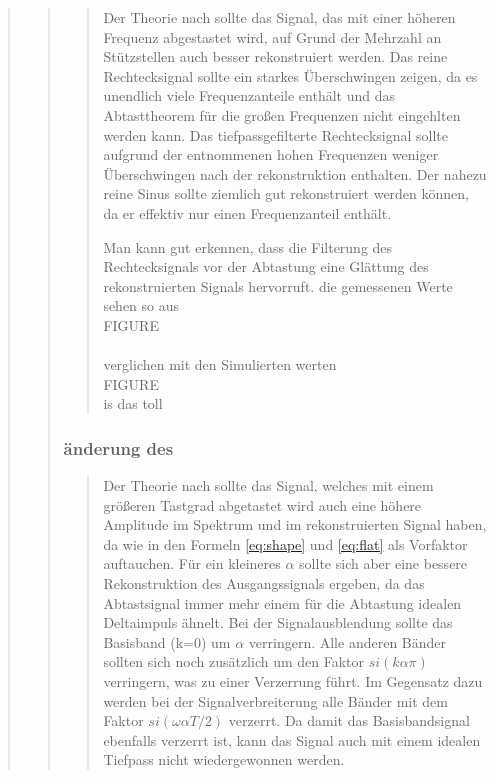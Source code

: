 \begin{quote}
\begin{quote}
\begin{quote}
            Der Theorie nach sollte das Signal, das mit einer höheren
            Frequenz abgestastet wird, auf Grund der Mehrzahl an Stützstellen
            auch besser rekonstruiert werden.
            Das reine Rechtecksignal sollte ein starkes Überschwingen zeigen, da
            es unendlich viele Frequenzanteile enthält und das Abtasttheorem für
            die großen Frequenzen nicht eingehlten werden kann.
            Das tiefpassgefilterte Rechtecksignal sollte aufgrund der
            entnommenen hohen Frequenzen weniger Überschwingen nach der rekonstruktion enthalten.
            Der nahezu reine Sinus sollte ziemlich gut rekonstruiert werden
            können, da er effektiv nur einen Frequenzanteil enthält.
            
            
            Man kann gut erkennen, dass die Filterung des Rechtecksignals vor
            der Abtastung eine Glättung des rekonstruierten Signals hervorruft.  
            die gemessenen Werte sehen so aus\\
            
            FIGURE\\
            \\
            
            
            verglichen mit den Simulierten werten\\
            
            FIGURE\\
            
            is das toll\\
        \end{quote}


        \subsubsection{änderung des \alpha }
        \begin{quote}
             
             Der Theorie nach sollte das Signal, welches mit einem größeren
             Tastgrad abgetastet wird auch eine höhere Amplitude im Spektrum und
             im rekonstruierten Signal haben, da wie in den Formeln
             \ref{eq:shape} und \ref{eq:flat} als Vorfaktor auftauchen. Für ein kleineres $\alpha$ sollte sich aber eine
             bessere Rekonstruktion des Ausgangssignals ergeben, da das
             Abtastsignal immer mehr einem für die Abtastung idealen
             Deltaimpuls ähnelt.
             Bei der Signalausblendung sollte das Basisband (k=0) um $\alpha$
             verringern. Alle anderen Bänder sollten sich noch zusätzlich um den
             Faktor $si(k\alpha\pi)$ verringern, was zu einer Verzerrung führt.
             Im Gegensatz dazu werden bei der Signalverbreiterung alle Bänder
             mit dem Faktor $si(\omega \alpha T/2)$ verzerrt. Da damit das
             Basisbandsignal ebenfalls verzerrt ist, kann das Signal auch mit
             einem idealen Tiefpass nicht wiedergewonnen werden.
             

\end{quote}
\end{quote}
\end{quote}

